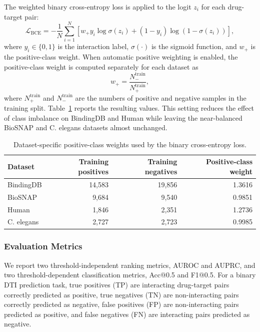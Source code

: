 The weighted binary cross-entropy loss is applied to the logit $z_i$ for each drug-target pair:
\begin{equation}
\mathcal{L}_{\mathrm{BCE}}=
-\frac{1}{N}\sum_{i=1}^{N}
\left[
w_{+}y_i\log \sigma(z_i)
+(1-y_i)\log\left(1-\sigma(z_i)\right)
\right],
\end{equation}
where $y_i\in\{0,1\}$ is the interaction label, $\sigma(\cdot)$ is the sigmoid function, and $w_{+}$ is the positive-class weight. When automatic positive weighting is enabled, the positive-class weight is computed separately for each dataset as
\begin{equation}
w_{+}=\frac{N_{-}^{\mathrm{train}}}{N_{+}^{\mathrm{train}}},
\end{equation}
where $N_{+}^{\mathrm{train}}$ and $N_{-}^{\mathrm{train}}$ are the numbers of positive and negative samples in the training split. Table~\ref{tab:dataset_pos_weight} reports the resulting values. This setting reduces the effect of class imbalance on BindingDB and Human while leaving the near-balanced BioSNAP and C. elegans datasets almost unchanged.

\begin{table}[!htbp]
\caption{Dataset-specific positive-class weights used by the binary cross-entropy loss.}
\label{tab:dataset_pos_weight}
\begin{center}
\begin{tabular}{lrrr}
\toprule
Dataset & Training positives & Training negatives & Positive-class weight \\
\midrule
BindingDB & 14,583 & 19,856 & 1.3616 \\
BioSNAP & 9,684 & 9,540 & 0.9851 \\
Human & 1,846 & 2,351 & 1.2736 \\
C. elegans & 2,727 & 2,723 & 0.9985 \\
\bottomrule
\end{tabular}
\end{center}
\end{table}

\subsubsection{Evaluation Metrics}

We report two threshold-independent ranking metrics, AUROC and AUPRC, and two threshold-dependent classification metrics, Acc@0.5 and F1@0.5. For a binary DTI prediction task, true positives (TP) are interacting drug-target pairs correctly predicted as positive, true negatives (TN) are non-interacting pairs correctly predicted as negative, false positives (FP) are non-interacting pairs predicted as positive, and false negatives (FN) are interacting pairs predicted as negative.

